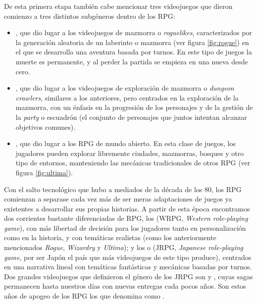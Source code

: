 De esta primera etapa también cabe mencionar tres videojuegos que dieron comienzo a tres distintos subgéneros dentro de los RPG: 
\begin{itemize}
\item {}, que dio lugar a los videojuegos de mazmorra o \textit{roguelikes}, caracterizados por la generación aleatoria de un laberinto o mazmorra (ver figura \ref{fig:rogue}) en el que se desarrolla una aventura basada por turnos. En este tipo de juegos la muerte es permanente, y al perder la partida se empieza en una nueva desde cero. 
\item {}, que dio lugar a los videojuegos de exploración de mazmorra o \textit{dungeon crawlers}, similares a los anteriores, pero centrados en la exploración de la mazmorra, con un énfasis en la progresión de los personajes y de la gestión de la \textit{party} o escuadrón (el conjunto de personajes que juntos intentan alcanzar objetivos comunes). 
\item {}, que dio lugar a los RPG de mundo abierto. En esta clase de juegos, los jugadores pueden explorar libremente ciudades, mazmorras, bosques y otro tipo de entornos, manteniendo las mecánicas tradicionales de otros RPG (ver figura \ref{fig:ultima}). 
\end{itemize}

\medskip

Con el salto tecnológico que hubo a mediados de la década de los 80, los RPG comienzan a separase cada vez más de ser meras adaptaciones de juegos ya existentes a desarrollar sus propias historias. A partir de esta época encontramos dos corrientes bastante diferenciadas de RPG, los  (WRPG, \textit{Western role-playing game}), con más libertad de decisión para los jugadores tanto en personalización como en la historia, y con temáticas realistas (como los anteriormente mencionados \textit{Rogue}, \textit{Wizardry} y \textit{Ultima}); y los  o  (JRPG, \textit{Japanese role-playing game}, por ser Japón el país que más videojuegos de este tipo produce), centrados en una narrativa lineal con temáticas fantásticas y mecánicas basadas por turnos. Dos grandes videojuegos que definieron el género de los JRPG son  y , cuyas sagas permanecen hasta nuestros días con nuevas entregas cada pocos años. Son estos años de apogeo de los RPG los que \citeauthor{barton2008dungeons} denomina como .

